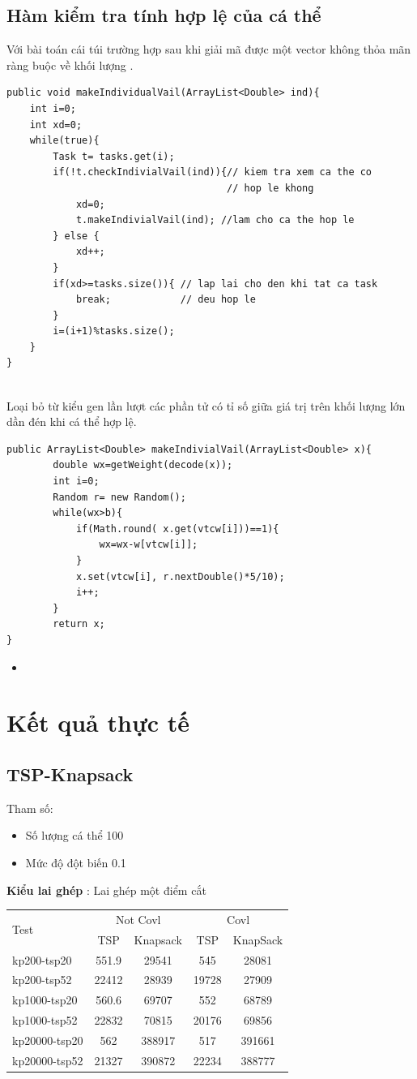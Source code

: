 \documentclass[a4paper,12pt]{report}
\begin{document}
\subsection{Hàm kiểm tra tính hợp lệ của cá thể}
Với bài toán cái túi trường hợp sau khi giải mã được một vector không thỏa mãn ràng buộc về khối lượng . 
\begin{lstlisting}
public void makeIndividualVail(ArrayList<Double> ind){
	int i=0;
	int xd=0;	
	while(true){
		Task t= tasks.get(i);
		if(!t.checkIndivialVail(ind)){// kiem tra xem ca the co		
									  // hop le khong
			xd=0;
			t.makeIndivialVail(ind); //lam cho ca the hop le
		} else {
			xd++;
		}
		if(xd>=tasks.size()){ // lap lai cho den khi tat ca task
			break;            // deu hop le
		}
		i=(i+1)%tasks.size();
	}
}
	
\end{lstlisting}
Loại bỏ từ kiểu gen lần lượt các phần tử có tỉ số giữa giá trị trên khối lượng lớn dần đén khi cá thể hợp lệ.
\begin{lstlisting}
public ArrayList<Double> makeIndivialVail(ArrayList<Double> x){
		double wx=getWeight(decode(x));
		int i=0;
		Random r= new Random();
		while(wx>b){
			if(Math.round( x.get(vtcw[i]))==1){
				wx=wx-w[vtcw[i]];
			}
			x.set(vtcw[i], r.nextDouble()*5/10);
			i++;
		}
		return x;
}
\end{lstlisting}
\begin{itemize}
\item 
\end{itemize}
\section{Kết quả thực tế}
\subsection{TSP-Knapsack}
Tham số:

\begin{itemize}
\item Số lượng cá thể 100
\item Mức độ đột biến 0.1
\end{itemize}
\textbf{Kiểu lai ghép} : Lai ghép một điểm cắt


\begin{longtable}{|l |c |c |c |c|}
\hline
\multirow{2}{*}{Test} 
& \multicolumn{2}{c|}{Not Covl} &\multicolumn{2}{|c|}{Covl} \\
\cline{2-5}
&TSP & Knapsack & TSP & KnapSack \\
\hline
kp200-tsp20  & 551.9&29541 &545 &28081 
\\ \hline
kp200-tsp52&22412 &28939&19728 &27909 \\ \hline
kp1000-tsp20 &560.6&69707&552&68789 \\ \hline
kp1000-tsp52 &22832&70815&20176&69856 \\ \hline
kp20000-tsp20 &562&388917&517 &391661 \\ \hline
kp20000-tsp52 &21327&390872&22234& 388777\\ \hline
\end{longtable}
\end{document}
